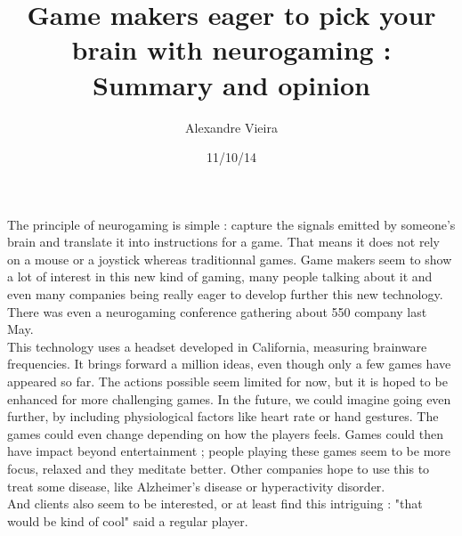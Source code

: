 \documentclass{article}
\title{Game makers eager to pick your brain with neurogaming :\\ Summary and opinion}
\author{Alexandre Vieira}
\date{11/10/14}
\begin{document}
\maketitle
The principle of neurogaming is simple : capture the signals emitted by someone's brain and translate it into instructions for a game. That means it does not rely on a mouse or a joystick whereas traditionnal games. Game makers seem to show a lot of interest in this new kind of gaming, many people talking about it and even many companies being really eager to develop further this new technology. There was even a neurogaming conference gathering about 550 company last May.\\
This technology uses a headset developed in California, measuring brainware frequencies. It brings forward a million ideas, even though only a few games have appeared so far. The actions possible seem limited for now, but it is hoped to be enhanced for more challenging games. In the future, we could imagine going even further, by including physiological factors like heart rate or hand gestures. The games could even change depending on how the players feels. Games could then have impact beyond entertainment ; people playing these games seem to be more focus, relaxed and they meditate better. Other companies hope to use this to treat some disease, like Alzheimer's disease or hyperactivity disorder.\\
And clients also seem to be interested, or at least find this intriguing : "that would be kind of cool" said a regular player.
\end{document}
